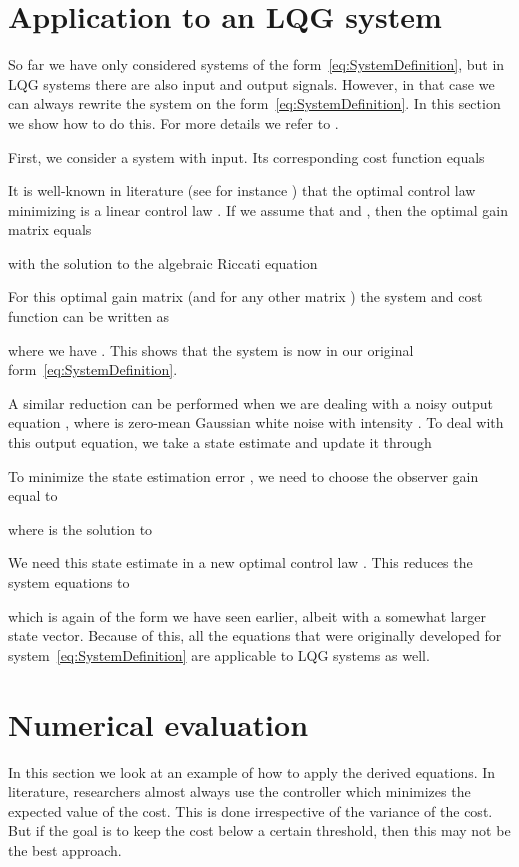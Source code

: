 \documentclass[twocolumn]{autart}
\begin{document}
\section{Application to an LQG system} \label{s:ApplicationToAnLQGSetUp}

So far we have only considered systems of the form~\eqref{eq:SystemDefinition}, but in LQG systems there are also input and output signals. However, in that case we can always rewrite the system on the form~\eqref{eq:SystemDefinition}. In this section we show how to do this. For more details we refer to \cite{LQBook,MFCBook,DMCSBook,StochasticControlBook}.

First, we consider a system  with input. Its corresponding cost function equals

It is well-known in literature (see for instance \cite{KalmanFilter}) that the optimal control law minimizing  is a linear control law . If we assume that  and , then the optimal gain matrix  equals

with  the solution to the algebraic Riccati equation

For this optimal gain matrix  (and for any other matrix ) the system and cost function can be written as 

where we have . This shows that the system is now in our original form~\eqref{eq:SystemDefinition}.

A similar reduction can be performed when we are dealing with a noisy output equation , where  is zero-mean Gaussian white noise with intensity . To deal with this output equation, we take a state estimate  and update it through

To minimize the state estimation error , we need to choose the observer gain  equal to

where  is the solution to

We need this state estimate in a new optimal control law . This reduces the system equations to

which is again of the form we have seen earlier, albeit with a somewhat larger state vector. Because of this, all the equations that were originally developed for system~\eqref{eq:SystemDefinition} are applicable to LQG systems as well.

\section{Numerical evaluation} \label{s:NumericalEvaluation}

In this section we look at an example of how to apply the derived equations. In literature, researchers almost always use the controller which minimizes the expected value of the cost. This is done irrespective of the variance of the cost. But if the goal is to keep the cost below a certain threshold, then this may not be the best approach.
\end{document}
